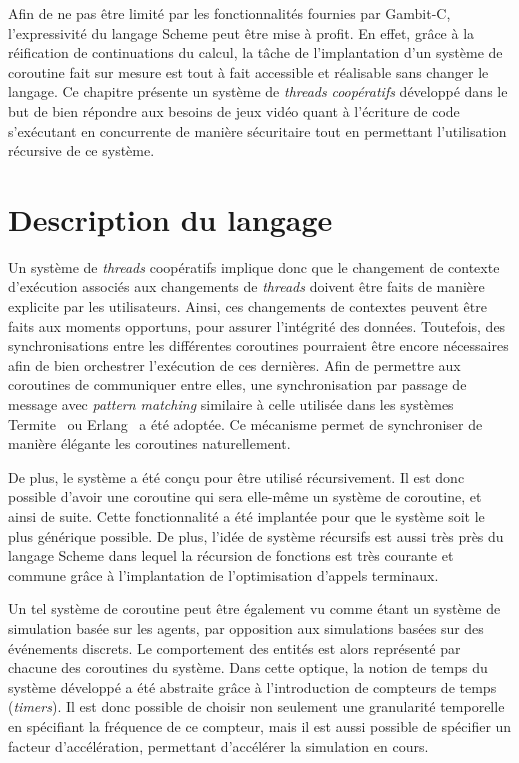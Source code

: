\documentclass[12pt,oneside,letterpaper,francais]{book}
\begin{document}
Afin de ne pas être limité par les fonctionnalités fournies par
Gambit-C, l'expressivité du langage Scheme peut être mise à profit. En
effet, grâce à la réification de continuations du calcul, la tâche de
l'implantation d'un système de coroutine fait sur mesure est tout à
fait accessible et réalisable sans changer le langage. Ce chapitre
présente un système de \textit{threads} \emph{coopératifs} développé
dans le but de bien répondre aux besoins de jeux vidéo quant à
l'écriture de code s'exécutant en concurrente de manière sécuritaire
tout en permettant l'utilisation récursive de ce système.


\section{Description du langage}

Un système de \textit{threads} coopératifs implique donc que le
changement de contexte d'exécution associés aux changements de
\textit{threads} doivent être faits de manière explicite par les
utilisateurs. Ainsi, ces changements de contextes peuvent être faits
aux moments opportuns, pour assurer l'intégrité des
données. Toutefois, des synchronisations entre les différentes
coroutines pourraient être encore nécessaires afin de bien orchestrer
l'exécution de ces dernières. Afin de permettre aux coroutines de
communiquer entre elles, une synchronisation par passage de message
avec \textit{pattern matching} similaire à celle utilisée dans les
systèmes Termite~\cite{Termite_paper} ou Erlang~\cite{Erlang} a été
adoptée. Ce mécanisme permet de synchroniser de manière élégante les
coroutines naturellement.

De plus, le système a été conçu pour être utilisé récursivement. Il
est donc possible d'avoir une coroutine qui sera elle-même un système
de coroutine, et ainsi de suite. Cette fonctionnalité a été implantée
pour que le système soit le plus générique possible. De plus, l'idée
de système récursifs est aussi très près du langage Scheme dans lequel
la récursion de fonctions est très courante et commune grâce à
l'implantation de l'optimisation d'appels terminaux.

Un tel système de coroutine peut être également vu comme étant un
système de simulation basée sur les agents, par opposition aux
simulations basées sur des événements discrets. Le comportement des
entités est alors représenté par chacune des coroutines du
système. Dans cette optique, la notion de temps du système développé a
été abstraite grâce à l'introduction de compteurs de temps
(\textit{timers}). Il est donc possible de choisir non seulement une
granularité temporelle en spécifiant la fréquence de ce compteur, mais
il est aussi possible de spécifier un facteur d'accélération,
permettant d'accélérer la simulation en cours.
\end{document}
